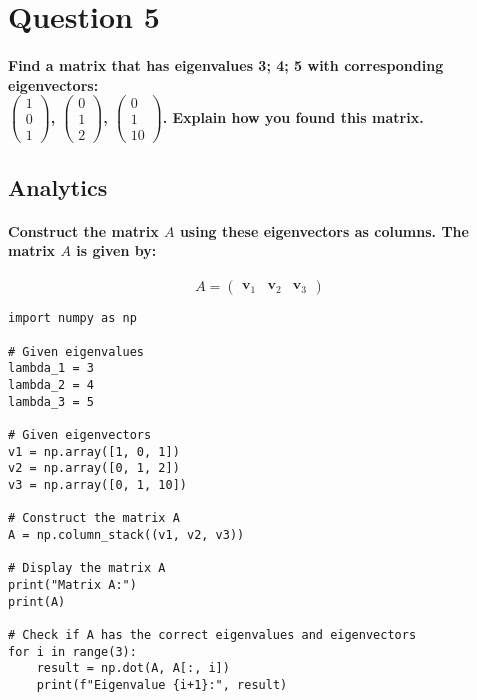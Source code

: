 \section{Question 5}
\paragraph{Find a matrix that has eigenvalues 3; 4; 5 with corresponding
    eigenvectors: \\
    $\begin{pmatrix}
            1 \\ 0 \\ 1
        \end{pmatrix}$,
    $\begin{pmatrix}
            0 \\ 1 \\ 2
        \end{pmatrix}$,
    $\begin{pmatrix}
            0 \\ 1 \\ 10
        \end{pmatrix}$.
    Explain how you found this matrix.
}
\subsection{Analytics}
\paragraph{Construct the matrix \(A\) using these eigenvectors as columns. The matrix \(A\) is given by:}
% 
% 
% 
% 
% 
% 
% 
\[ A = \begin{pmatrix} \mathbf{v}_1 & \mathbf{v}_2 & \mathbf{v}_3 \end{pmatrix} \]
% 
% 
% 
% 
% 
% 
% 
\begin{lstlisting}[style=pystyle]
import numpy as np

# Given eigenvalues
lambda_1 = 3
lambda_2 = 4
lambda_3 = 5

# Given eigenvectors
v1 = np.array([1, 0, 1])
v2 = np.array([0, 1, 2])
v3 = np.array([0, 1, 10])

# Construct the matrix A
A = np.column_stack((v1, v2, v3))

# Display the matrix A
print("Matrix A:")
print(A)

# Check if A has the correct eigenvalues and eigenvectors
for i in range(3):
    result = np.dot(A, A[:, i])
    print(f"Eigenvalue {i+1}:", result)
    
\end{lstlisting}
